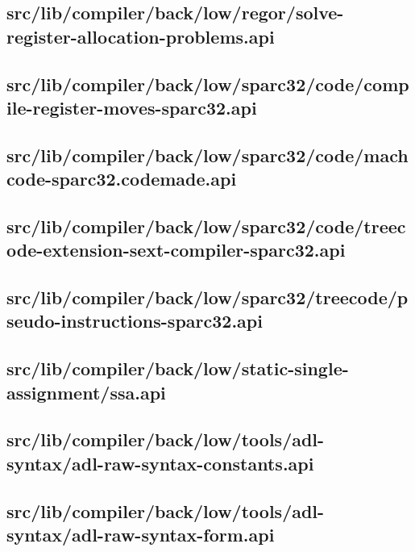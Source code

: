 \subsection{src/lib/compiler/back/low/regor/solve-register-allocation-problems.api}


\subsection{src/lib/compiler/back/low/sparc32/code/compile-register-moves-sparc32.api}


\subsection{src/lib/compiler/back/low/sparc32/code/machcode-sparc32.codemade.api}


\subsection{src/lib/compiler/back/low/sparc32/code/treecode-extension-sext-compiler-sparc32.api}


\subsection{src/lib/compiler/back/low/sparc32/treecode/pseudo-instructions-sparc32.api}


\subsection{src/lib/compiler/back/low/static-single-assignment/ssa.api}


\subsection{src/lib/compiler/back/low/tools/adl-syntax/adl-raw-syntax-constants.api}


\subsection{src/lib/compiler/back/low/tools/adl-syntax/adl-raw-syntax-form.api}


